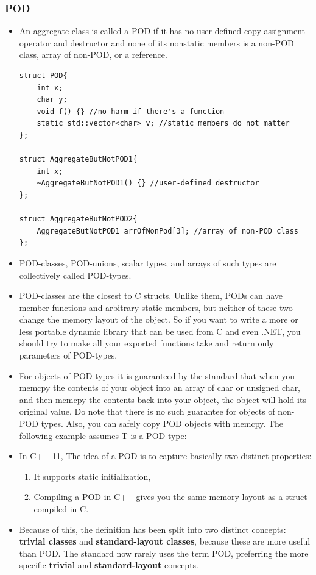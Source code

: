 \documentclass[a4paper,11pt,twoside]{book}
\begin{document}
\subsubsection{POD}
\begin{itemize}
	
	\item An aggregate class is called a POD if it has no user-defined copy-assignment operator and destructor and none of its nonstatic members is a non-POD class, array of non-POD, or a reference.
	
\begin{lstlisting}[numbers=none]
struct POD{
	int x;
	char y;
	void f() {} //no harm if there's a function
	static std::vector<char> v; //static members do not matter
};
	
struct AggregateButNotPOD1{
	int x;
	~AggregateButNotPOD1() {} //user-defined destructor
};
	
struct AggregateButNotPOD2{
	AggregateButNotPOD1 arrOfNonPod[3]; //array of non-POD class
};
\end{lstlisting}
	
	
	\item POD-classes, POD-unions, scalar types, and arrays of such types are collectively called POD-types.
	
	\item POD-classes are the closest to C structs. Unlike them, PODs can have member functions and arbitrary static members, but neither of these two change the memory layout of the object. So if you want to write a more or less portable dynamic library that can be used from C and even .NET, you should try to make all your exported functions take and return only parameters of POD-types.
	
	\item For objects of POD types it is guaranteed by the standard that when you memcpy the contents of your object into an array of char or unsigned char, and then memcpy the contents back into your object, the object will hold its original value. Do note that there is no such guarantee for objects of non-POD types. Also, you can safely copy POD objects with memcpy. The following example assumes T is a POD-type:
	
	
	\item In C++ 11, The idea of a POD is to capture basically two distinct properties:
	\begin{enumerate}
		\item It supports static initialization,
		\item Compiling a POD in C++ gives you the same memory layout as a struct compiled in C.
	\end{enumerate}
	
	\item Because of this, the definition has been split into two distinct concepts: \textbf{trivial classes} and \textbf{standard-layout classes}, because these are more useful than POD. The standard now rarely uses the term POD, preferring the more specific \textbf{trivial} and \textbf{standard-layout} concepts.
\end{itemize}
\end{document}
